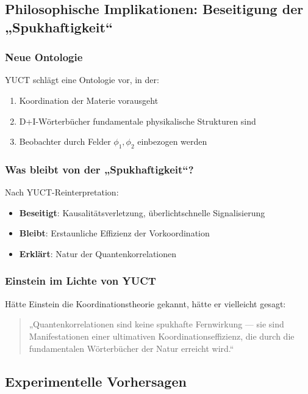 \documentclass[11pt,a4paper]{article}
\begin{document}
	\subsection{Philosophische Implikationen: Beseitigung der „Spukhaftigkeit“}
	\label{subsec:philosophical}
	
	\subsubsection{Neue Ontologie}
	YUCT schlägt eine Ontologie vor, in der:
	\begin{enumerate}
		\item Koordination der Materie vorausgeht
		\item D+I-Wörterbücher fundamentale physikalische Strukturen sind
		\item Beobachter durch Felder $\phi_1, \phi_2$ einbezogen werden
	\end{enumerate}
	
	\subsubsection{Was bleibt von der „Spukhaftigkeit“?}
	Nach YUCT-Reinterpretation:
	\begin{itemize}
		\item \textbf{Beseitigt}: Kausalitätsverletzung, überlichtschnelle Signalisierung
		\item \textbf{Bleibt}: Erstaunliche Effizienz der Vorkoordination
		\item \textbf{Erklärt}: Natur der Quantenkorrelationen
	\end{itemize}
	
	\subsubsection{Einstein im Lichte von YUCT}
	Hätte Einstein die Koordinationstheorie gekannt, hätte er vielleicht gesagt:
	
	\begin{quote}
		„Quantenkorrelationen sind keine spukhafte Fernwirkung — sie sind Manifestationen einer ultimativen Koordinationseffizienz, die durch die fundamentalen Wörterbücher der Natur erreicht wird.“
	\end{quote}
	
	\subsection{Experimentelle Vorhersagen}
	\label{subsec:epr-experimental}
	
\end{document}
